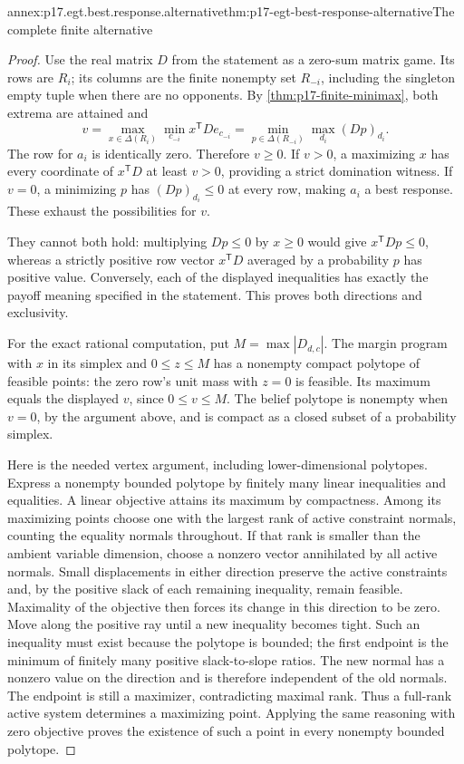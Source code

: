 \begin{annexitem}{annex:p17.egt.best.response.alternative}{thm:p17-egt-best-response-alternative}{The complete finite alternative}
\begin{proof}
Use the real matrix \(D\) from the statement as a zero-sum
matrix game. Its rows are \(R_i\); its columns are the finite
nonempty set \(R_{-i}\), including the singleton empty tuple
when there are no opponents.
By \cref{thm:p17-finite-minimax}, both extrema are attained and
\[
 v=\max_{x\in\Delta(R_i)}\min_{c_{-i}}x^{\mathsf T}D e_{c_{-i}}
   =\min_{p\in\Delta(R_{-i})}\max_{d_i}(Dp)_{d_i}.
\]
The row for \(a_i\) is identically zero. Therefore \(v\geq0\).
If \(v>0\), a maximizing \(x\) has every coordinate of
\(x^{\mathsf T}D\) at least \(v>0\), providing a strict
domination witness. If \(v=0\), a minimizing \(p\) has
\((Dp)_{d_i}\leq0\) at every row, making \(a_i\) a best response.
These exhaust the possibilities for \(v\).

They cannot both hold: multiplying \(Dp\leq0\) by \(x\geq0\)
would give \(x^{\mathsf T}Dp\leq0\), whereas a strictly positive
row vector \(x^{\mathsf T}D\) averaged by a probability \(p\)
has positive value. Conversely, each of the displayed
inequalities has exactly the payoff meaning specified in
the statement. This proves both directions and exclusivity.

For the exact rational computation, put \(M=\max|D_{d,c}|\).
The margin program with \(x\) in its simplex and \(0\leq z\leq M\)
has a nonempty compact polytope of feasible points: the zero
row's unit mass with \(z=0\) is feasible. Its maximum equals
the displayed \(v\), since \(0\leq v\leq M\).
The belief polytope is nonempty when \(v=0\), by the argument above,
and is compact as a closed subset of a probability simplex.

Here is the needed vertex argument, including lower-dimensional
polytopes. Express a nonempty bounded polytope by finitely many
linear inequalities and equalities. A linear objective attains
its maximum by compactness. Among its maximizing points choose
one with the largest rank of active constraint normals, counting
the equality normals throughout. If that rank is smaller than
the ambient variable dimension, choose a nonzero vector annihilated
by all active normals. Small displacements in either direction
preserve the active constraints and, by the positive slack of each
remaining inequality, remain feasible. Maximality of the objective
then forces its change in this direction to be zero.
Move along the positive ray until a new inequality becomes tight.
Such an inequality must exist because the polytope is bounded;
the first endpoint is the minimum of finitely many positive
slack-to-slope ratios. The new normal has a nonzero value on
the direction and is therefore independent of the old normals.
The endpoint is still a maximizer, contradicting maximal rank.
Thus a full-rank active system determines a maximizing point.
Applying the same reasoning with zero objective proves the
existence of such a point in every nonempty bounded polytope.


\end{proof}
\end{annexitem}
